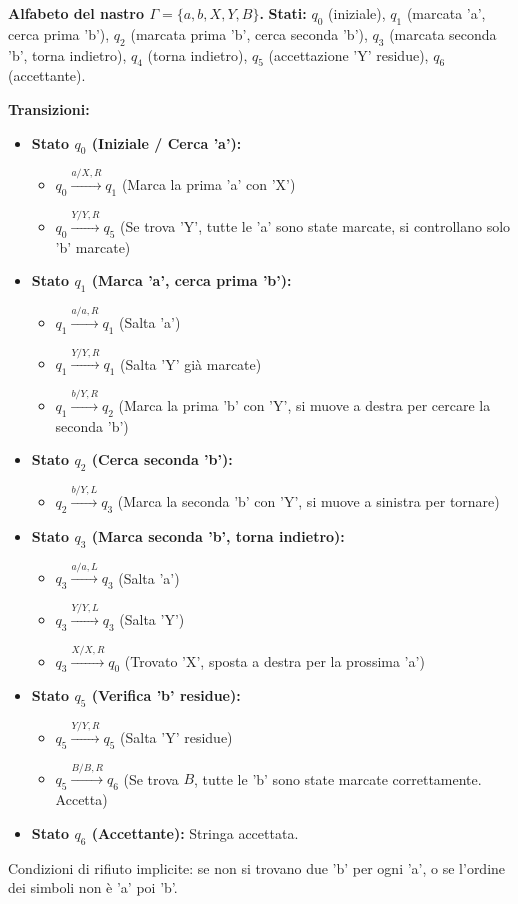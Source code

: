 \documentclass[a4paper, 11pt]{book} %
\theoremstyle{definition}
\begin{document}
\noindent \textbf{Alfabeto del nastro $\Gamma = \{a, b, X, Y, B\}$.}
\noindent \textbf{Stati:} $q_0$ (iniziale), $q_1$ (marcata 'a', cerca prima 'b'), $q_2$ (marcata prima 'b', cerca seconda 'b'), $q_3$ (marcata seconda 'b', torna indietro), $q_4$ (torna indietro), $q_5$ (accettazione 'Y' residue), $q_6$ (accettante).

\noindent \textbf{Transizioni:}
\begin{itemize}
    \item \textbf{Stato $q_0$ (Iniziale / Cerca 'a'):}
        \begin{itemize}
            \item $q_0 \xrightarrow{a / X, R} q_1$ (Marca la prima 'a' con 'X')
            \item $q_0 \xrightarrow{Y / Y, R} q_5$ (Se trova 'Y', tutte le 'a' sono state marcate, si controllano solo 'b' marcate)
        \end{itemize}
    \item \textbf{Stato $q_1$ (Marca 'a', cerca prima 'b'):}
        \begin{itemize}
            \item $q_1 \xrightarrow{a / a, R} q_1$ (Salta 'a')
            \item $q_1 \xrightarrow{Y / Y, R} q_1$ (Salta 'Y' già marcate)
            \item $q_1 \xrightarrow{b / Y, R} q_2$ (Marca la prima 'b' con 'Y', si muove a destra per cercare la seconda 'b')
        \end{itemize}
    \item \textbf{Stato $q_2$ (Cerca seconda 'b'):}
        \begin{itemize}
            \item $q_2 \xrightarrow{b / Y, L} q_3$ (Marca la seconda 'b' con 'Y', si muove a sinistra per tornare)
        \end{itemize}
    \item \textbf{Stato $q_3$ (Marca seconda 'b', torna indietro):}
        \begin{itemize}
            \item $q_3 \xrightarrow{a / a, L} q_3$ (Salta 'a')
            \item $q_3 \xrightarrow{Y / Y, L} q_3$ (Salta 'Y')
            \item $q_3 \xrightarrow{X / X, R} q_0$ (Trovato 'X', sposta a destra per la prossima 'a')
        \end{itemize}
    \item \textbf{Stato $q_5$ (Verifica 'b' residue):}
        \begin{itemize}
            \item $q_5 \xrightarrow{Y / Y, R} q_5$ (Salta 'Y' residue)
            \item $q_5 \xrightarrow{B / B, R} q_6$ (Se trova $B$, tutte le 'b' sono state marcate correttamente. Accetta)
        \end{itemize}
    \item \textbf{Stato $q_6$ (Accettante):} Stringa accettata.
\end{itemize}
Condizioni di rifiuto implicite: se non si trovano due 'b' per ogni 'a', o se l'ordine dei simboli non è 'a' poi 'b'.
\end{document}
